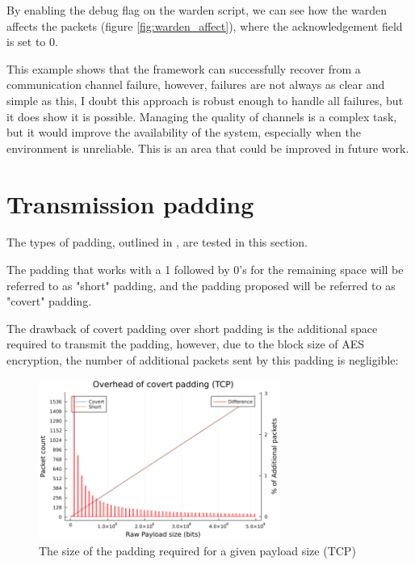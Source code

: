 By enabling the debug flag on the warden script, we can see how the warden affects the packets (figure \ref{fig:warden_affect}), where the acknowledgement field is set to 0.

\clearpage

This example shows that the framework can successfully recover from a communication channel failure, however, failures are not always as clear and simple as this, I doubt this approach is robust enough to handle all failures, but it does show it is possible. Managing the quality of channels is a complex task, but it would improve the availability of the system, especially when the environment is unreliable. This is an area that could be improved in future work.

\section{Transmission padding}
\label{sec:padding_testing}

The types of padding, outlined in , are tested in this section.

The padding that works with a 1 followed by 0's for the remaining space will be referred to as "short" padding, and the padding proposed will be referred to as "covert" padding.

The drawback of covert padding over short padding is the additional space required to transmit the padding, however, due to the block size of AES encryption, the number of additional packets sent by this padding is negligible:

\begin{figure}[h]
    \centering
    \includegraphics[width=0.7\textwidth]{fig/padding_size_TCP.png}
    \caption{The size of the padding required for a given payload size (TCP)}
    \label{fig:padding_size_TCP}
\end{figure}

